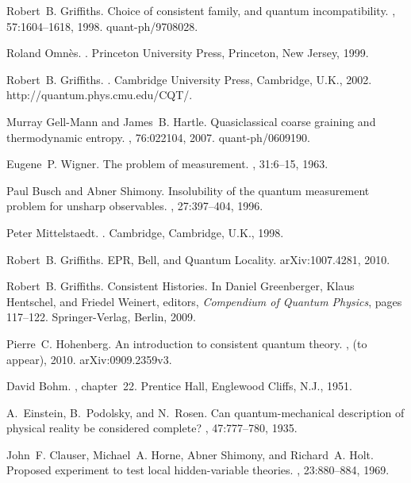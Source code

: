 \documentclass[10pt]{article} %
\begin{document}
\begin{thebibliography}{10}
Robert~B. Griffiths.
\newblock Choice of consistent family, and quantum incompatibility.
, 57:1604--1618, 1998.
\newblock quant-ph/9708028.

Roland Omn\`es.
.
\newblock Princeton University Press, Princeton, New Jersey, 1999.

Robert~B. Griffiths.
.
\newblock Cambridge University Press, Cambridge, U.K., 2002.
\newblock http://quantum.phys.cmu.edu/CQT/.

Murray Gell-Mann and James~B. Hartle.
\newblock Quasiclassical coarse graining and thermodynamic entropy.
, 76:022104, 2007.
\newblock quant-ph/0609190.

Eugene~P. Wigner.
\newblock The problem of measurement.
, 31:6--15, 1963.

Paul Busch and Abner Shimony.
\newblock Insolubility of the quantum measurement problem for unsharp
  observables.
, 27:397--404, 1996.

Peter Mittelstaedt.
.
\newblock Cambridge, Cambridge, U.K., 1998.

Robert~B. Griffiths.
\newblock E{P}{R}, {B}ell, and {Q}uantum {L}ocality.
\newblock arXiv:1007.4281, 2010.

Robert~B. Griffiths.
\newblock Consistent {H}istories.
\newblock In Daniel Greenberger, Klaus Hentschel, and Friedel Weinert, editors,
  {\em Compendium of Quantum Physics}, pages 117--122. Springer-Verlag, Berlin,
  2009.

Pierre~C. Hohenberg.
\newblock An introduction to consistent quantum theory.
, (to appear), 2010.
\newblock arXiv:0909.2359v3.

David Bohm.
, chapter~22.
\newblock Prentice Hall, Englewood Cliffs, N.J., 1951.

A.~Einstein, B.~Podolsky, and N.~Rosen.
\newblock Can quantum-mechanical description of physical reality be considered
  complete?
, 47:777--780, 1935.

John~F. Clauser, Michael~A. Horne, Abner Shimony, and Richard~A. Holt.
\newblock Proposed experiment to test local hidden-variable theories.
, 23:880--884, 1969.


\end{thebibliography}
\end{document}
